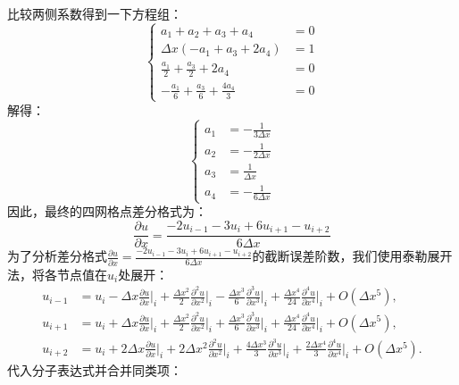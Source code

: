 \documentclass[UTF8]{ctexart}
\begin{document}
比较两侧系数得到一下方程组：
\begin{equation}
    \begin{cases}
        a_1 + a_2 + a_3 + a_4 &= 0 \\
        \Delta x(-a_1 + a_3 + 2a_4) &= 1 \\
        \frac{a_1}{2} + \frac{a_3}{2} + 2a_4 &= 0 \\
        -\frac{a_1}{6} + \frac{a_3}{6} + \frac{4a_4}{3} &= 0
    \end{cases}
\end{equation}
解得：
\begin{equation}
    \begin{cases}
        a_1 &=  -\frac{1}{3\Delta x}\\
        a_2 &=  -\frac{1}{2\Delta x}\\
        a_3 &=  \frac{1}{\Delta x}\\
        a_4 &=  -\frac{1}{6\Delta x}
    \end{cases}
\end{equation}
因此，最终的四网格点差分格式为：
\begin{equation}
    \frac{\partial u}{\partial x} = \frac{-2u_{i-1}-3u_i + 6u_{i+1} - u_{i+2}}{6\Delta x} 
\end{equation}
为了分析差分格式$\frac{\partial u}{\partial x} = \frac{-2u_{i-1} - 3u_i + 6u_{i+1} - u_{i+2}}{6\Delta x}$的截断误差阶数，我们使用泰勒展开法，将各节点值在$u_i$处展开：
$$
\begin{aligned}
u_{i-1} &= u_i - \Delta x \frac{\partial u}{\partial x}\bigg|_i + \frac{\Delta x^2}{2} \frac{\partial^2 u}{\partial x^2}\bigg|_i - \frac{\Delta x^3}{6} \frac{\partial^3 u}{\partial x^3}\bigg|_i + \frac{\Delta x^4}{24} \frac{\partial^4 u}{\partial x^4}\bigg|_i + O(\Delta x^5), \\
u_{i+1} &= u_i + \Delta x \frac{\partial u}{\partial x}\bigg|_i + \frac{\Delta x^2}{2} \frac{\partial^2 u}{\partial x^2}\bigg|_i + \frac{\Delta x^3}{6} \frac{\partial^3 u}{\partial x^3}\bigg|_i + \frac{\Delta x^4}{24} \frac{\partial^4 u}{\partial x^4}\bigg|_i + O(\Delta x^5), \\
u_{i+2} &= u_i + 2\Delta x \frac{\partial u}{\partial x}\bigg|_i + 2\Delta x^2 \frac{\partial^2 u}{\partial x^2}\bigg|_i + \frac{4\Delta x^3}{3} \frac{\partial^3 u}{\partial x^3}\bigg|_i + \frac{2\Delta x^4}{3} \frac{\partial^4 u}{\partial x^4}\bigg|_i + O(\Delta x^5).
\end{aligned}
$$
代入分子表达式并合并同类项：
\end{document}
